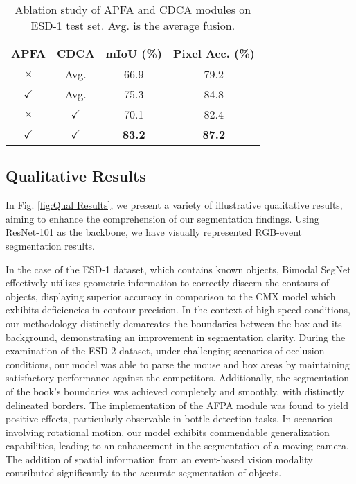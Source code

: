 \documentclass[lettersize,journal]{IEEEtran}
\begin{document}
\begin{table}[ht]
\centering
\caption{Ablation study of APFA and CDCA modules on ESD-1 test set. Avg. is the average fusion.}
\begin{tabular}{|c|c|c|c|}
\hline
\textbf{APFA} & \textbf{CDCA} & \textbf{mIoU (\%)} & \textbf{Pixel Acc. (\%)} \\
\hline
$\times$ & Avg. &  66.9  & 79.2 \\
\hline
$\checkmark$ & Avg. & 75.3  & 84.8  \\
\hline
$\times$ & $\checkmark$ & 70.1  & 82.4  \\
\hline
$\checkmark$ & $\checkmark$ & \textbf{83.2}  & \textbf{87.2}  \\
\hline
\end{tabular}
\label{tab:ablation_study}
\end{table}








\subsection{Qualitative Results}

In Fig. \ref{fig:Qual Results}, we present a variety of illustrative qualitative results, aiming to enhance the comprehension of our segmentation findings. Using ResNet-101 as the backbone, we have visually represented RGB-event segmentation results.

In the case of the ESD-1 dataset, which contains known objects, Bimodal SegNet effectively utilizes geometric information to correctly discern the contours of objects, displaying superior accuracy in comparison to the CMX model which exhibits deficiencies in contour precision. In the context of high-speed conditions, our methodology distinctly demarcates the boundaries between the box and its background, demonstrating an improvement in segmentation clarity. During the examination of the ESD-2 dataset, under challenging scenarios of occlusion conditions, our model was able to parse the mouse and box areas by maintaining satisfactory performance against the competitors. Additionally, the segmentation of the book's boundaries was achieved completely and smoothly, with distinctly delineated borders. The implementation of the AFPA module was found to yield positive effects, particularly observable in bottle detection tasks. In scenarios involving rotational motion, our model exhibits commendable generalization capabilities, leading to an enhancement in the segmentation of a moving camera. The addition of spatial information from an event-based vision modality contributed significantly to the accurate segmentation of objects. 
\end{document}
